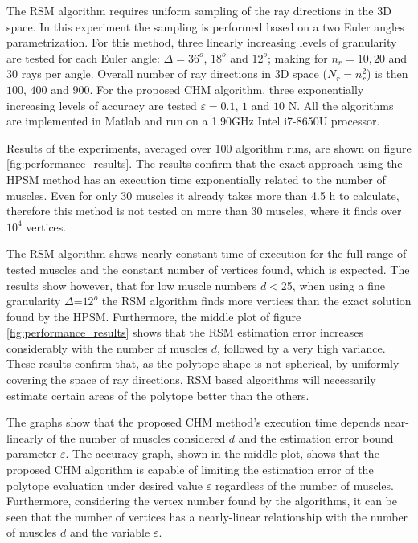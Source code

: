 The RSM algorithm \cite{carmichael2011Towards} requires uniform sampling of the ray directions in the 3D space. In this experiment the sampling is performed based on a two Euler angles parametrization. {For this method, three linearly increasing levels of granularity are tested for each Euler angle: $\Delta\!=\!36^o$, $18^o$ and $12^o$;  making for $n_r\!=\!10,20$ and $30$ rays per angle. Overall number of ray directions in 3D space ($N_r\!=\!n_r^2$) is then $100$, $400$ and $900$. For the proposed CHM algorithm, three exponentially increasing levels of accuracy are tested $\varepsilon\!=\!0.1$, $1$ and $10$ N.} All the algorithms are implemented in Matlab and run on a 1.90GHz Intel i7-8650U processor.

Results of the experiments, averaged over 100 algorithm runs, are shown on figure \ref{fig:performance_results}. The results confirm that the exact approach using the HPSM method has an execution time exponentially related to the number of muscles. Even for only 30 muscles it already takes more than 4.5 h to calculate, therefore this method is not tested on more than 30 muscles, where it finds over $10^4$ vertices.  

The RSM algorithm shows nearly constant time of execution for the full range of tested muscles and the constant number of vertices found, which is expected. The results show however, that for low muscle numbers $d\!<$25, when using a fine granularity $\Delta$=$12^o$ the RSM algorithm finds more vertices than the exact solution found by the HPSM. Furthermore, the middle plot of figure \ref{fig:performance_results} shows that the RSM estimation error increases considerably with the number of muscles $d$, followed by a very
high variance. These results confirm that, as the polytope shape is not spherical, by uniformly covering the space of ray directions, RSM based algorithms will necessarily estimate certain areas of the polytope better than the others.

The graphs show that the proposed CHM method's execution time depends near-linearly of the number of muscles considered $d$ and the estimation error bound parameter $\varepsilon$. The accuracy graph, shown in the middle plot, shows that the proposed CHM algorithm is capable of limiting the estimation error of the polytope evaluation under desired value $\varepsilon$ regardless of the number of muscles. Furthermore, considering the vertex number found by the algorithms, it can be seen that the number of vertices has a nearly-linear relationship with the number of muscles $d$ and the variable $\varepsilon$. 

